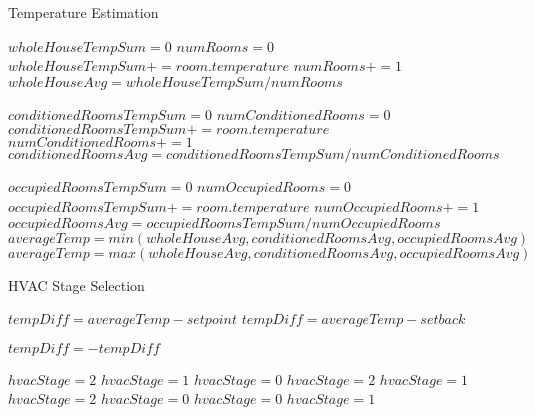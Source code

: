 \begin{algorithm}                      %
\caption{Temperature Estimation}          %
\label{alg:temperatureEstimation}%
\begin{algorithmic}                    %
\STATE $wholeHouseTempSum = 0$
\STATE $numRooms = 0$
\STATE $wholeHouseTempSum += room.temperature$
\STATE $numRooms += 1$
\ENDFOR
\STATE $wholeHouseAvg = wholeHouseTempSum / numRooms$

\STATE $conditionedRoomsTempSum = 0$
\STATE $numConditionedRooms = 0$
\STATE $conditionedRoomsTempSum += room.temperature$
\STATE $numConditionedRooms += 1$
\ENDIF
\ENDFOR
\STATE $conditionedRoomsAvg = conditionedRoomsTempSum / numConditionedRooms$

\STATE $occupiedRoomsTempSum = 0$
\STATE $numOccupiedRooms = 0$
\STATE $occupiedRoomsTempSum += room.temperature$
\STATE $numOccupiedRooms += 1$
\ENDIF
\ENDFOR
\STATE $occupiedRoomsAvg = occupiedRoomsTempSum / numOccupiedRooms$
\STATE $averageTemp = min(wholeHouseAvg, conditionedRoomsAvg,
occupiedRoomsAvg)$
\ELSE
\STATE $averageTemp = max(wholeHouseAvg, conditionedRoomsAvg,
occupiedRoomsAvg)$
\ENDIF
\end{algorithmic}
\end{algorithm}


\begin{algorithm}                      %
\caption{HVAC Stage Selection}          %
\label{alg:hvacStageSelection}%
\begin{algorithmic}                    %
\STATE $tempDiff = averageTemp - setpoint$
\ELSE
\STATE $tempDiff = averageTemp - setback$
\ENDIF

\STATE $tempDiff = -tempDiff$
\ENDIF

\STATE $hvacStage = 2$
\STATE $hvacStage = 1$
\ELSE
\STATE $hvacStage = 0$
\ENDIF
{}
\STATE $hvacStage = 2$
\STATE $hvacStage = 1$
\ENDIF
{}
\STATE $hvacStage = 2$
\STATE $hvacStage = 0$
\ENDIF
\ELSE
{}
\STATE $hvacStage = 0$
\STATE $hvacStage = 1$
\ENDIF
\ENDIF
\end{algorithmic}
\end{algorithm}


